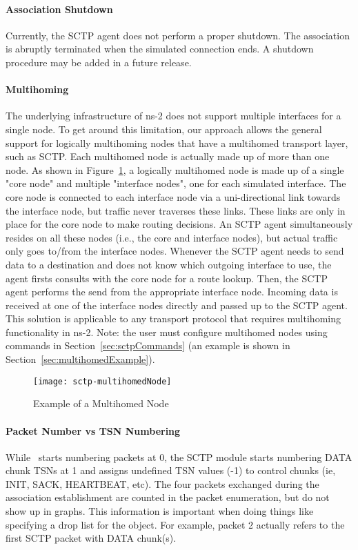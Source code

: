       \paragraph{Association Shutdown} Currently, the SCTP agent does not
      perform a proper shutdown. The association is abruptly terminated
      when the simulated connection ends. A shutdown procedure may be
      added in a future release.

      \paragraph{Multihoming} The underlying infrastructure of ns-2
      does not support multiple interfaces for a single node. To get
      around this limitation, our approach allows the general support for
      logically multihoming nodes that have a multihomed transport layer,
      such as SCTP. Each multihomed node is actually made up of more than
      one node. As shown in Figure~\ref{fig:multihomedNode}, a logically
      multihomed node is made up of a single "core node" and multiple
      "interface nodes", one for each simulated interface. The core node
      is connected to each interface node via a uni-directional link
      towards the interface node, but traffic never traverses these
      links. These links are only in place for the core node to make
      routing decisions. An SCTP agent simultaneously resides on all these
      nodes (i.e., the core and interface nodes), but actual traffic only
      goes to/from the interface nodes.  Whenever the SCTP agent needs to
      send data to a destination and does not know which outgoing
      interface to use, the agent firsts consults with the core node for a
      route lookup. Then, the SCTP agent performs the send from the
      appropriate interface node. Incoming data is received at one of the
      interface nodes directly and passed up to the SCTP agent. This
      solution is applicable to any transport protocol that requires
      multihoming functionality in ns-2. Note: the user must configure
      multihomed nodes using commands in Section~\ref{sec:sctpCommands}
      (an example is shown in Section~\ref{sec:multihomedExample}).

      \begin{figure}[tb] 
	\centerline{\texttt{[image: sctp-multihomedNode]}}
	\caption{Example of a Multihomed Node}
	\label{fig:multihomedNode} 
      \end{figure}

      \paragraph{Packet Number vs TSN Numbering} While \ns~starts numbering
      packets at 0, the SCTP module starts numbering DATA chunk TSNs at 1
      and assigns undefined TSN values (-1) to control chunks (ie, INIT,
      SACK, HEARTBEAT, etc). The four packets exchanged during the
      association establishment are counted in the packet enumeration, but
      do not show up in graphs. This information is important when doing
      things like specifying a drop list for the 
      object. For example, packet 2 actually refers to the first SCTP
      packet with DATA chunk(s).


